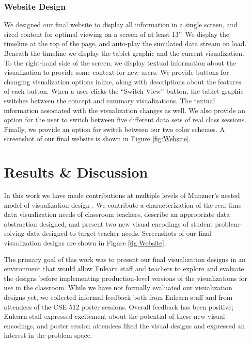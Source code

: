 \documentclass{sigchi}
\begin{document}
\subsubsection{Website Design}
We designed our final website to display all information in a single screen, and sized content for optimal viewing on a screen of at least 13''. We display the timeline at the top of the page, and auto-play the simulated data stream on load. Beneath the timeline we display the tablet graphic and the current visualization. To the right-hand side of the screen, we display textual information about the visualization to provide some context for new users. We provide buttons for changing visualization options inline, along with descriptions about the features of each button. When a user clicks the ``Switch View'' button, the tablet graphic switches between the concept and summary visualizations. The textual information associated with the visualization changes as well. We also provide an option for the user to switch between five different data sets of real class sessions. Finally, we provide an option for switch between our two color schemes.  A screenshot of our final website is shown in Figure \ref{fig:Website}. 



\section{Results \& Discussion}

In this work we have made contributions at multiple levels of Munzner's nested model of visualization design \cite{Munzner09}. We contribute a characterization of the real-time data visualization needs of classroom teachers, describe an appropriate data abstraction designed, and present two new visual encodings of student problem-solving data designed to target teacher needs. Screenshots of our final visualization designs are shown in Figure \ref{fig:Website}.

The primary goal of this work was to present our final visualization designs in an environment that would allow Enlearn staff and teachers to explore and evaluate the designs before implementing production-level versions of the visualizations for use in the classroom. While we have not formally evaluated our visualization designs yet, we collected informal feedback both from Enlearn staff and from attendees of the CSE 512 poster sessions. Overall feedback has been positive; Enlearn staff expressed excitement about the potential of these new visual encodings, and poster session attendees liked the visual designs and expressed an interest in the problem space.
\end{document}
